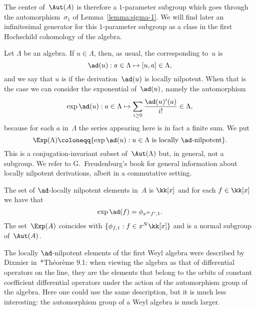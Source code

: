 The center of~$\Aut(A)$ is therefore a $1$-parameter subgroup which goes
through the automorphism~$\sigma_1$ of Lemma~\ref{lemma:sigma-1}. We will
find later an infinitesimal generator for this $1$-parameter subgroup as a
class in the first Hochschild cohomology of the algebra. 

\bigskip

Let $\Lambda$ be an algebra. If $u\in \Lambda$, then, as usual, the  corresponding to~$u$ is   
  \[
  \ad(u):a\in \Lambda\mapsto[u,a]\in \Lambda,
  \]
and we say that $u$ is  if the
derivation~$\ad(u)$ is locally nilpotent. When that is the case we can
consider the exponential of~$\ad(u)$, namely the automorphism
  \[
  \exp\ad(u) : a\in\Lambda
               \mapsto 
               \sum_{i\geq0}\frac{\ad(u)^i(a)}{i!}\in \Lambda,
  \]
because for each $a$ in~$\Lambda$ the series appearing here is in fact a
finite sum. We put
  \[
  \Exp(\Lambda) \coloneqq \{ \exp\ad(u):\text{$u\in \Lambda$ is 
                        locally $\ad$-nilpotent} \}.
  \]
This is a conjugation-invariant subset of~$\Aut(\Lambda)$ but, in general,
not a subgroup. We refer to G.~Freudenburg's book \cite{Freudenburg} for
general information about locally nilpotent derivations, albeit in a
commutative setting.

\begin{Proposition}\label{prop:ad-nilpotent}
The set of $\ad$-locally nilpotent elements in~$A$ is $\kk[x]$ and for each
$f\in\kk[x]$ we have that
  \[
  \exp\ad(f)=\phi_{x^Nf',1}.
  \]
The set~$\Exp(A)$ coincides with $\{\phi_{f,1}:f\in x^N\kk[x]\}$ and is
a normal subgroup of~$\Aut(A)$.
\end{Proposition}

The locally $\ad$-nilpotent elements of the first Weyl algebra were
described by Dixmier in~\cite{Dixmier:3}*{Théorème 9.1}: when viewing the
algebra as that of differential operators on the line, they are the
elements that belong to the orbits of constant coefficient differential
operators under the action of the automorphism group of the algebra. Here
one could use the same description, but it is much less interesting: the
automorphism group of a Weyl algebra is much larger.

